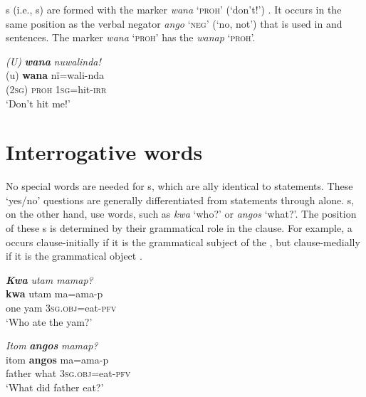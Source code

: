 s (i.e., s) are formed with the  marker \textit{wana} ‘\textsc{proh}’ (‘don’t!’) . It occurs in the same position as the  verbal negator \textit{ango} ‘\textsc{neg’} (‘no, not’) that is used in  and  sentences. The  marker \textit{wana} ‘\textsc{proh}’ has the  \textit{wanap} ‘\textsc{proh}’.


\ea%
    \label{ex:overview:51}
    \textit{(U)} \textbf{\textit{wana}} \textit{nuwalinda!}\\
\gll    (u)    \textbf{wana}  nï=wali-nda\\
    (\textsc{2sg)}  \textsc{proh}  \textsc{1sg=}hit-\textsc{irr}\\
\glt    ‘Don’t hit me!’
\z

\section{Interrogative words}\label{sec:overview:2.11}



No special words are needed for s, which are ally identical to  statements. These ‘yes/no’ questions are generally differentiated from statements through  alone. s, on the other hand, use  words, such as \textit{kwa} ‘who?’ or \textit{angos} ‘what?’. The position of these s is determined by their grammatical role in the clause. For example, a  occurs clause-initially if it is the grammatical subject of the  , but clause-medially if it is the grammatical object .

\ea%
    \label{ex:overview:52}
    \textbf{\textit{Kwa}} \textit{utam mamap?}\\
\gll    \textbf{kwa}  utam  ma=ama-p\\
    one    yam  3\textsc{sg.obj}=eat-\textsc{pfv}\\
\glt    ‘Who ate the yam?’
\z

\ea%
    \label{ex:overview:53}
    \textit{Itom} \textbf{\textit{angos}} \textit{mamap?}\\
\gll    itom  \textbf{angos}  ma=ama-p\\
    father  what  3\textsc{sg.obj}=eat-\textsc{pfv}\\
\glt    ‘What did father eat?’
\z

